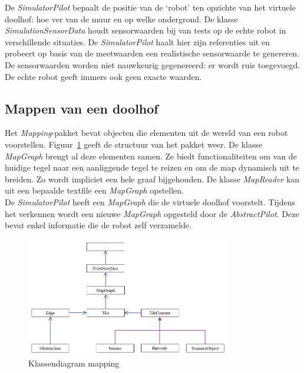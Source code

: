 \documentclass[tt3]{penoverslag}
\begin{document}
De \textit{SimulatorPilot} bepaalt de positie van de `robot' ten opzichte van het virtuele doolhof: hoe ver van de muur en op welke ondergrond. De klasse \textit{SimulationSensorData} houdt sensorwaarden bij van tests op de echte robot in verschillende situaties. De \textit{SimulatorPilot} haalt hier zijn referenties uit en probeert op basis van de meetwaarden een realistische sensorwaarde te genereren. De sensorwaarden worden niet nauwkeurig gegenereerd: er wordt ruis toegevoegd. De echte robot geeft immers ook geen exacte waarden.\\

\subsection{Mappen van een doolhof} %
\label{ssec:Mapping}
Het \textit{Mapping}-pakket bevat objecten die elementen uit de wereld van een robot voorstellen. Figuur~\ref{fig:klasMap} geeft de structuur van het pakket weer. De klasse \textit{MapGraph} brengt al deze elementen samen. Ze biedt functionaliteiten om van de huidige tegel naar een aanliggende tegel te reizen en om de map dynamisch uit te breiden. Zo wordt impliciet een hele graaf bijgehouden. De klasse \textit{MapReader} kan uit een bepaalde textfile een \textit{MapGraph} opstellen.\\

De \textit{SimulatorPilot} heeft een \textit{MapGraph} die de virtuele doolhof voorstelt. Tijdens het verkennen wordt een nieuwe \textit{MapGraph} opgesteld door de \textit{AbstractPilot}. Deze bevat enkel informatie die de robot zelf verzamelde.

\begin{figure}[h]
\centering
	\includegraphics[width=0.8\textwidth]{klasMapping}
\caption{Klassendiagram mapping}
\label{fig:klasMap}
\end{figure}
\end{document}
